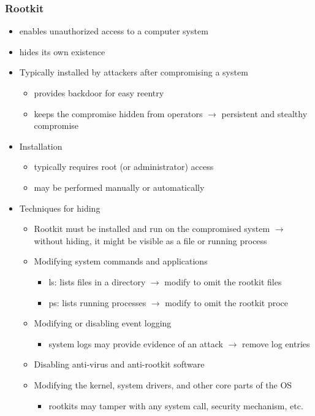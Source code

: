 \documentclass[final]{article}
\begin{document}
\subsubsection*{Rootkit}
\begin{itemize}[nosep]
    \item enables unauthorized access to a computer system
    \item hides its own existence
    \item Typically installed by attackers after compromising a system
          \begin{itemize}[nosep]
              \item provides backdoor for easy reentry
              \item keeps the compromise hidden from operators $\rightarrow$ persistent and stealthy compromise
          \end{itemize}
    \item Installation
          \begin{itemize}[nosep]
              \item typically requires root (or administrator) access
              \item may be performed manually or automatically
          \end{itemize}
    \item Techniques for hiding
          \begin{itemize}[nosep]
              \item Rootkit must be installed and run on the compromised system $\rightarrow$ without hiding, it might be visible as a file or running process
              \item Modifying system commands and applications
                    \begin{itemize}[nosep]
                        \item ls: lists files in a directory $\rightarrow$ modify to omit the rootkit files
                        \item ps: lists running processes $\rightarrow$ modify to omit the rootkit proce
                    \end{itemize}
              \item Modifying or disabling event logging
                    \begin{itemize}[nosep]
                        \item system logs may provide evidence of an attack $\rightarrow$ remove log entries
                    \end{itemize}
              \item Disabling anti-virus and anti-rootkit software
              \item Modifying the kernel, system drivers, and other core parts of the OS
                    \begin{itemize}[nosep]
                        \item rootkits may tamper with any system call, security mechanism, etc.
                    \end{itemize}
          \end{itemize}
\end{itemize}
\end{document}

